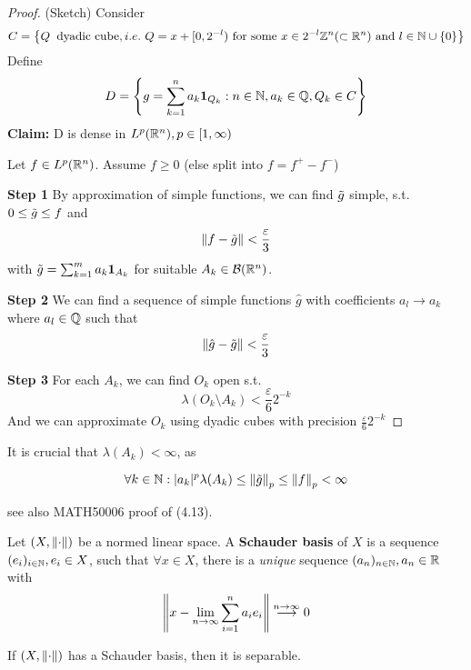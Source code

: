 \documentclass{article}
\begin{document}
\begin{proof}
    (Sketch)  Consider  
    $$
    C = \left\{Q\: \text{\ dyadic\ cube}, i.e. \ Q = x + [0, 2^{-l}) \text{\ for\ some\ } x \in 2^{-l} \inte^n(\subset \real^n) \text{\ and\ } l\in \natu \cup \{0\}\right\}
    $$   
    Define  
    $$
    D = \left\{g = \sum_{k=1}^n a_k \mathbf{1}_{Q_k}: n\in \mathbb{N}, a_k \in \mathbb{Q}, Q_k \in C \right\}
    $$
    \textbf{Claim:} D is dense in $L^p(\mathbb{R}^n), p \in [1, \infty)$  

    Let $f \in L^p(\mathbb{R}^n)$. Assume $f \geq 0$ (else split into $f=f^+-f^-$)  

    \textbf{Step 1} By approximation of simple functions, we can find $\Tilde{g}$ simple, s.t. $0 \leq \Tilde{g} \leq f$ and  
    $$
    \left\|{f-\Tilde{g}}\right\| < \frac{\varepsilon}{3}
    $$  
    with $\Tilde{g}=\sum_{k=1}^m a_k \mathbf{1}_{A_k}$ for suitable $A_k \in \mathcal{B}(\mathbb{R}^n)$.  

    \textbf{Step 2} We can find a sequence of simple functions $\hat{g}$ with coefficients $a_l \to a_k$ where $a_l\in \mathbb{Q}$ such that  
    $$
    \left\|{\hat{g}-\Tilde{g}}\right\| < \frac{\varepsilon}{3}
    $$  

    \textbf{Step 3} For each $A_k$, we can find $O_k$ open s.t.  
    $$
    \lambda(O_k\setminus A_k) < \frac{\varepsilon}{6} 2^{-k}
    $$
    And we can approximate $O_k$ using dyadic cubes with precision $\frac{\varepsilon}{6} 2^{-k}$
\end{proof}  

It is crucial that $\lambda(A_k) < \infty$, as  

$$
\forall k \in \mathbb{N}: |a_k|^p \lambda(A_k) \leq \left\|{\Tilde{g}}\right\|_p \leq \left\|{f}\right\|_p < \infty
$$  

see also MATH50006 proof of (4.13). 

\begin{definition}

Let $(X,\left\|{\cdot}\right\|)$ be a normed linear space. A \textbf{Schauder basis} of $X$ is a sequence $(e_i)_{i\in \mathbb{N}}, e_i \in X$, such that $\forall x \in X$,  there is a \textit{unique} sequence $(a_n)_{n\in \mathbb{N}}, a_n \in \mathbb{R}$ with
$$
\left\|{x - \lim_{n\to\infty}\sum_{i=1}^n a_i e_i}\right\| \overset{n\to \infty}{\longrightarrow} 0
$$
\end{definition}


\begin{proposition}
\label{Schauder implies separability}
	If $(X, \left\|{\cdot}\right\|)$ has a Schauder basis, then it is separable.
\end{proposition}  
\end{document}
